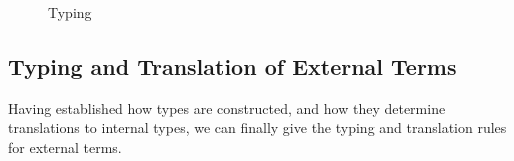 \documentclass{llncs}
\begin{document}
\begin{figure*}[t]
\begin{mathpar}

\end{mathpar}
\caption{Typing}
\label{statics-EL}
\end{figure*}
\subsection{Typing and Translation of External Terms}\label{external-terms}
Having established how types are constructed, and how they determine translations to internal types, we can finally give the typing and translation rules for external terms.
\end{document}
